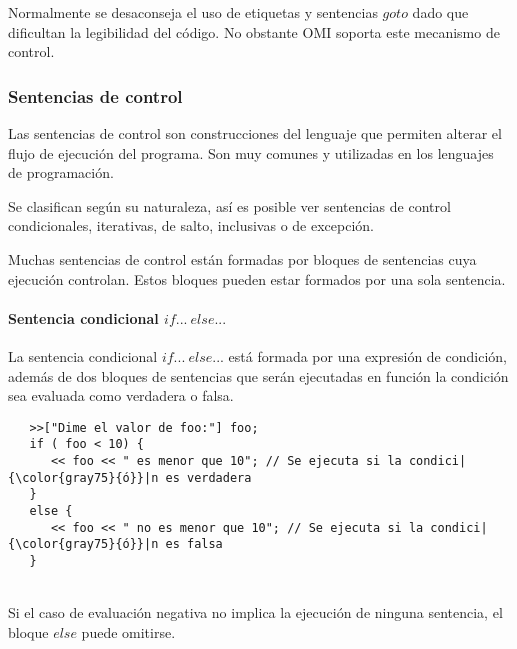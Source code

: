 Normalmente se desaconseja el uso de etiquetas y sentencias $goto$ dado que dificultan la legibilidad del código. No obstante OMI 
soporta este mecanismo de control.




\subsubsection{Sentencias de control}

Las sentencias de control son construcciones del lenguaje que permiten alterar el flujo de ejecución del programa. Son muy comunes y
utilizadas en los lenguajes de programación.

Se clasifican según su naturaleza, así es posible ver sentencias de control condicionales, iterativas, de salto, inclusivas o de excepción.

Muchas sentencias de control están formadas por bloques de sentencias cuya ejecución controlan. Estos bloques pueden estar formados por una sola sentencia.



\paragraph{Sentencia condicional $if...\ else...$}\label{sec:stmt_if}

La sentencia condicional $if...\ else...$ está formada por una expresión de condición, además de dos bloques de sentencias que serán ejecutadas en función la condición sea evaluada 
como verdadera o falsa. \\

\begin{lstlisting}
   >>["Dime el valor de foo:"] foo;
   if ( foo < 10) { 
      << foo << " es menor que 10"; // Se ejecuta si la condici|{\color{gray75}{ó}}|n es verdadera
   }
   else {
      << foo << " no es menor que 10"; // Se ejecuta si la condici|{\color{gray75}{ó}}|n es falsa
   }
\end{lstlisting}
\hfill\\

Si el caso de evaluación negativa no implica la ejecución de ninguna sentencia, el bloque $else$ puede omitirse. \\

